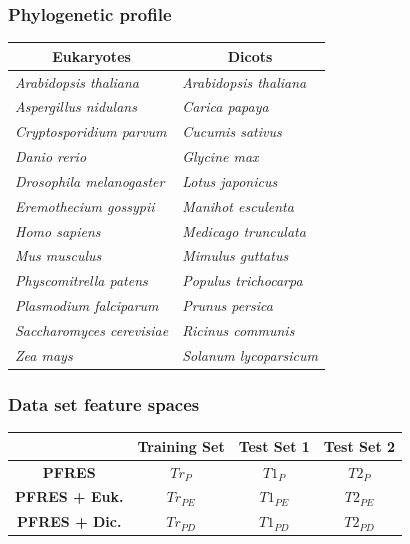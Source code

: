 \documentclass{beamer}
\begin{document}
\begin{frame}
  \frametitle{Phylogenetic profile}
\begin{table} \centering
  \begin{tabular}{ l l }
    \hline
    \multicolumn{1}{c}{\textbf{Eukaryotes}} & \multicolumn{1}{c}{\textbf{Dicots}} \\ \hline
    \textit{Arabidopsis thaliana} & \textit{Arabidopsis thaliana} \\
    \textit{Aspergillus nidulans} & \textit{Carica papaya} \\
    \textit{Cryptosporidium parvum} & \textit{Cucumis sativus} \\
    \textit{Danio rerio} & \textit{Glycine max} \\
    \textit{Drosophila melanogaster} \hspace{15px} & \textit{Lotus japonicus} \\
    \textit{Eremothecium gossypii} & \textit{Manihot esculenta} \\
    \textit{Homo sapiens} & \textit{Medicago trunculata} \\
    \textit{Mus musculus} & \textit{Mimulus guttatus} \\
    \textit{Physcomitrella patens} & \textit{Populus trichocarpa} \\
    \textit{Plasmodium falciparum} & \textit{Prunus persica} \\
    \textit{Saccharomyces cerevisiae} & \textit{Ricinus communis} \\
    \textit{Zea mays} & \textit{Solanum lycoparsicum} \\ \hline
  \end{tabular}
  \vspace{5px}
\end{table}
\end{frame}
\begin{frame}
  \frametitle{Data set feature spaces}
  \begin{table} \centering
  \begin{tabular}{ c c c c }
    \hspace{10px} & \textbf{Training Set} & \textbf{Test Set 1} & \textbf{Test Set 2} \\ \hline
    \textbf{PFRES}        & $Tr_{P}$ & $T1_{P}$ & $T2_{P}$ \\
    \textbf{PFRES + Euk.} & $Tr_{PE}$ & $T1_{PE}$ & $T2_{PE}$ \\
    \textbf{PFRES + Dic.} & $Tr_{PD}$ & $T1_{PD}$ & $T2_{PD}$ \\ \hline
  \end{tabular}
  \vspace{5px}
\end{table}
\end{frame}
\end{document}
